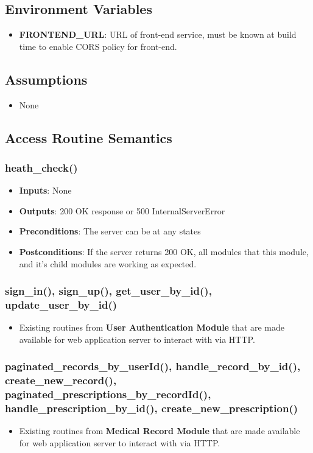 \documentclass[12pt, titlepage]{article}
\begin{document}
\subsection{Environment Variables}
\begin{itemize}
    \item \textbf{FRONTEND\_URL}: URL of front-end service, must be known at build time to enable CORS policy for front-end.
\end{itemize}

\subsection{Assumptions}
\begin{itemize}
    \item None
\end{itemize}

\subsection{Access Routine Semantics}

\subsubsection{heath\_check()}
\begin{itemize}
    \item \textbf{Inputs}: None
    \item \textbf{Outputs}: 200 OK response or 500 InternalServerError
    \item \textbf{Preconditions}: The server can be at any states
    \item \textbf{Postconditions}: If the server returns 200 OK, all modules that this module, and it's child modules are working as expected.
\end{itemize}

\subsubsection{sign\_in(), sign\_up(), get\_user\_by\_id(), update\_user\_by\_id()}
\begin{itemize}
    \item Existing routines from \textbf{User Authentication Module} that are made available for web application server to interact with via HTTP.
\end{itemize}

\subsubsection{paginated\_records\_by\_userId(), handle\_record\_by\_id(), create\_new\_record(), paginated\_prescriptions\_by\_recordId(), handle\_prescription\_by\_id(), create\_new\_prescription() }
\begin{itemize}
    \item Existing routines from \textbf{Medical Record Module} that are made available for web application server to interact with via HTTP.
\end{itemize}
\end{document}
